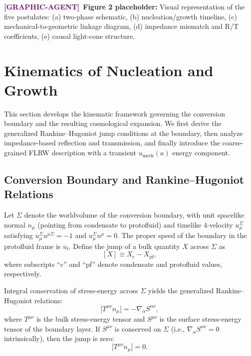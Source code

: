 \documentclass[11pt,a4paper]{article}
\newcommand{\umech}{u_{\mathrm{mech}}}
\newcommand{\uf}{u_{\mathrm{f}}}
\theoremstyle{definition}
\newcommand{\GRAPHAGENT}{\textcolor{purple}{\textbf{[GRAPHIC-AGENT]}}}
\begin{document}
\GRAPHAGENT~\textbf{Figure 2 placeholder:} Visual representation of the five postulates: (a) two-phase schematic, (b) nucleation/growth timeline, (c) mechanical-to-geometric linkage diagram, (d) impedance mismatch and R/T coefficients, (e) causal light-cone structure.

\section{Kinematics of Nucleation and Growth}
\label{sec:kinematics}

This section develops the kinematic framework governing the conversion boundary and the resulting cosmological expansion. We first derive the generalized Rankine--Hugoniot jump conditions at the boundary, then analyze impedance-based reflection and transmission, and finally introduce the coarse-grained FLRW description with a transient $\umech(a)$ energy component.

\subsection{Conversion Boundary and Rankine--Hugoniot Relations}
\label{sec:RH}

Let $\Sigma$ denote the worldvolume of the conversion boundary, with unit spacelike normal $n_\mu$ (pointing from condensate to protofluid) and timelike 4-velocity $u_\mu^{\Sigma}$ satisfying $u_\mu^{\Sigma} u^{\mu \Sigma} = -1$ and $u_\mu^{\Sigma} n^\mu = 0$. The proper speed of the boundary in the protofluid frame is $\uf$. Define the jump of a bulk quantity $X$ across $\Sigma$ as
\begin{equation}
\label{eq:jump_def}
[X] \equiv X_{\mathrm{c}} - X_{\mathrm{pf}},
\end{equation}
where subscripts ``c'' and ``pf'' denote condensate and protofluid values, respectively.

Integral conservation of stress-energy across $\Sigma$ yields the generalized Rankine--Hugoniot relations:
\begin{equation}
\label{eq:RH_general}
\big[ T^{\mu\nu} n_\mu \big] = - \nabla_\alpha S^{\alpha\nu},
\end{equation}
where $T^{\mu\nu}$ is the bulk stress-energy tensor and $S^{\mu\nu}$ is the surface stress-energy tensor of the boundary layer. If $S^{\mu\nu}$ is conserved on $\Sigma$ (i.e., $\nabla_\alpha S^{\alpha\nu} = 0$ intrinsically), then the jump is zero:
\begin{equation}
\label{eq:RH_simple}
\big[ T^{\mu\nu} n_\mu \big] = 0.
\end{equation}
\end{document}
